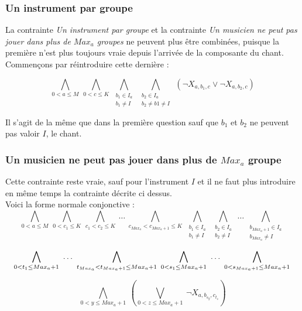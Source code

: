 \documentclass[11pt]{article}
\begin{document}
\subsubsection{Un instrument par groupe}

La contrainte \textsl{Un instrument par groupe} et la contrainte \textsl{Un musicien ne peut pas jouer dans plus de $Max_a$ groupes} ne peuvent plus être combinées, puisque la première n'est plus toujours vraie depuis l'arrivée de la composante du chant.\\

Commençons par réintroduire cette dernière :

$$\bigwedge\limits_{0<a\le M}\ \bigwedge\limits_{0<c\le K}\ \bigwedge\limits_{\substack{b_1\in I_a \\ b_1 \ne I}}\ \bigwedge\limits_{\substack{b_2\in I_a \\ b_2 \ne b1 \ne I}}\ \left(\neg X_{a,b_1,c} \vee \neg X_{a,b_2,c}\right)$$

Il s'agit de la même que dans la première question sauf que $b_1$ et $b_2$ ne peuvent pas valoir $I$, le chant.

\subsubsection{Un musicien ne peut pas jouer dans plus de $Max_a$ groupe}

Cette contrainte reste vraie, sauf pour l'instrument $I$ et il ne faut plus introduire en même temps la contrainte décrite ci dessus.\\
Voici la forme normale conjonctive :\\

$$\bigwedge\limits_{0<a\le M}\ \bigwedge\limits_{0<c_1\le K}\ \bigwedge\limits_{c_1<c_2\le K}\ \ldots\ \bigwedge\limits_{c_{{Max_a}}<c_{Max_{a}+1}\le K}\ \bigwedge\limits_{\substack{b_1 \in I_a \\ b_1 \ne I}}\ \bigwedge\limits_{\substack{b_2 \in I_a \\ b_2 \ne I}}\ \ldots\  \bigwedge\limits_{\substack{b_{Max_a+1} \in I_a \\ b_{Max_a} \ne I}} $$

$$ \bigwedge\limits_{0<t_{1}\le Max_a+1}\  \ldots\  \bigwedge\limits_{t_{Max_a}<t_{Max_a+1}\le Max_a+1}\ \bigwedge\limits_{0<s_1\le Max_a+1}\  \ldots\  \bigwedge\limits_{0<s_{Max_a+1}\le Max_a+1}\\$$

$$ \bigwedge\limits_{0<y\le Max_a+1}\  \left( \bigvee\limits_{0<z\le Max_a+1}\  \neg X_{a,b_{s_{y}},c_{t_{z}}}\right)$$
\end{document}
